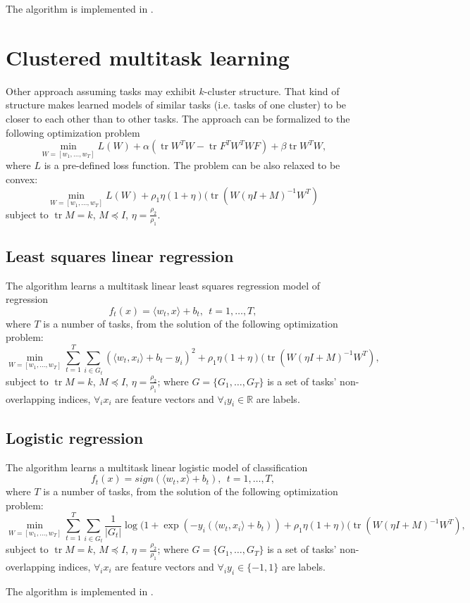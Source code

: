 The algorithm is implemented in .

\section{Clustered multitask learning}

Other approach assuming tasks may exhibit $k$-cluster structure. That kind of structure
makes learned models of similar tasks (i.e. tasks of one cluster) to be closer to each 
other than to other tasks. The approach can be formalized to the following optimization
problem
$$
\min_{W=\left[w_1, \dots, w_T\right]} L (W) + \alpha (\mathop{\mathrm{tr}} W^{T} W - \mathop{\mathrm{tr}} F^{T} W^{T} W F) + \beta \mathop{\mathrm{tr}} W^{T} W,
$$
where $L$ is a pre-defined loss function. The problem can be also relaxed to be convex:
$$
\min_{W=\left[w_1, \dots, w_T\right]} L (W) + \rho_1 \eta (1+\eta) (\mathop{\mathrm{tr}} (W (\eta I + M)^{-1} W^{T})
$$
subject to $\mathop{\mathrm{tr}} M = k$, $M \preceq I$, $\eta = \frac{\rho_2}{\rho_1}$.

\subsection{Least squares linear regression}

The algorithm learns a multitask linear least squares regression model of regression 
$$
f_t(x) = \langle w_t,x \rangle + b_t, ~~ t = 1, \dots, T,
$$
where $T$ is a number of tasks, from the solution of the following optimization problem:
$$
\min_{W=\left[w_1, \dots, w_T\right]} \sum_{t=1}^{T} \sum_{i \in G_t} \left(\langle w_t,x_i \rangle + b_t - y_i\right)^2
+ \rho_1 \eta (1+\eta) (\mathop{\mathrm{tr}} (W (\eta I + M)^{-1} W^{T}),
$$
subject to $\mathop{\mathrm{tr}} M = k$, $M \preceq I$, $\eta = \frac{\rho_2}{\rho_1}$; where $G = \{ G_1, \dots, G_T \}$ 
is a set of tasks' non-overlapping indices, $\forall_i x_i$ are feature 
vectors and $\forall_i y_i \in \mathbb{R}$ are labels.

\subsection{Logistic regression}

The algorithm learns a multitask linear logistic model of classification 
$$
f_t(x) = sign (\langle w_t,x \rangle + b_t), ~~ t = 1, \dots, T,
$$
where $T$ is a number of tasks, from the solution of the following optimization problem:
$$
\min_{W=\left[w_1, \dots, w_T\right]} \sum_{t=1}^{T} \sum_{i \in G_t} \frac{1}{|G_t|} \log (1+\exp\left(-y_i(\langle w_t,x_i \rangle + b_t)\right)
+ \rho_1 \eta (1+\eta) (\mathop{\mathrm{tr}} (W (\eta I + M)^{-1} W^{T}),
$$
subject to $\mathop{\mathrm{tr}} M = k$, $M \preceq I$, $\eta = \frac{\rho_2}{\rho_1}$; where $G = \{ G_1, \dots, G_T \}$ 
is a set of tasks' non-overlapping indices, $\forall_i x_i$ are feature 
vectors and $\forall_i y_i \in \{-1,1\}$ are labels.

The algorithm is implemented in .
